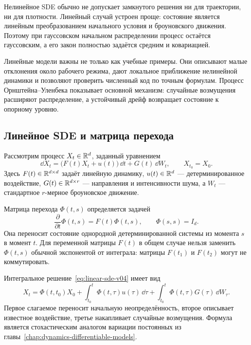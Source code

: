 Нелинейное SDE обычно не допускает замкнутого решения ни для траектории, ни для плотности. Линейный случай устроен проще: состояние является линейным преобразованием начального условия и броуновского движения. Поэтому при гауссовском начальном распределении процесс остаётся гауссовским, а его закон полностью задаётся средним и ковариацией.

Линейные модели важны не только как учебные примеры. Они описывают малые отклонения около рабочего режима, дают локальное приближение нелинейной динамики и позволяют проверить численный код по точным формулам. Процесс Орнштейна--Уленбека показывает основной механизм: случайные возмущения расширяют распределение, а устойчивый дрейф возвращает состояние к опорному уровню.

\subsection{Линейное SDE и матрица перехода}

Рассмотрим процесс $X_t\in\mathbb{R}^d$, заданный уравнением
\begin{equation}
\label{eq:linear-sde-v04}
\dd X_t
=
\bigl(F(t)X_t+u(t)\bigr)\,\dd t
+
G(t)\,\dd W_t,
\qquad
X_{t_0}=X_0.
\end{equation}
Здесь $F(t)\in\mathbb{R}^{d\times d}$ задаёт линейную динамику, $u(t)\in\mathbb{R}^d$ --- детерминированное воздействие, $G(t)\in\mathbb{R}^{d\times r}$ --- направления и интенсивности шума, а $W_t$ --- стандартное $r$-мерное броуновское движение.

Матрица перехода $\Phi(t,s)$ определяется задачей
\begin{equation}
\label{eq:transition-matrix-v04}
\frac{\partial}{\partial t}\Phi(t,s)
=
F(t)\Phi(t,s),
\qquad
\Phi(s,s)=I_d.
\end{equation}
Она переносит состояние однородной детерминированной системы из момента $s$ в момент $t$. Для переменной матрицы $F(t)$ в общем случае нельзя заменить $\Phi(t,s)$ обычной экспонентой от интеграла: матрицы $F(t_1)$ и $F(t_2)$ могут не коммутировать.

Интегральное решение~\eqref{eq:linear-sde-v04} имеет вид
\begin{equation}
\label{eq:linear-sde-solution-v04}
X_t
=
\Phi(t,t_0)X_0
+
\int_{t_0}^{t}\Phi(t,\tau)u(\tau)\,\dd\tau
+
\int_{t_0}^{t}\Phi(t,\tau)G(\tau)\,\dd W_\tau.
\end{equation}
Первое слагаемое переносит начальную неопределённость, второе описывает известное воздействие, третье накапливает случайные возмущения. Формула является стохастическим аналогом вариации постоянных из главы~\ref{chap:dynamics-differentiable-models}.

